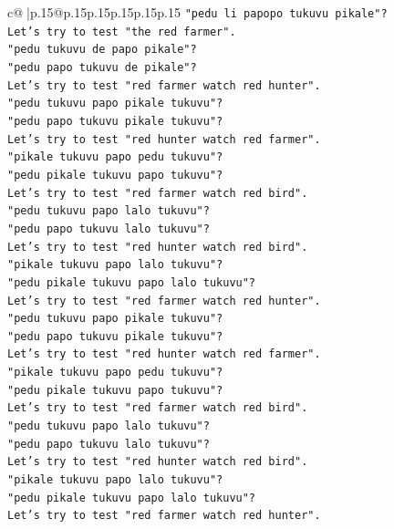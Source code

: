 \documentclass{article}
\begin{document}
{\begin{supertabular}{c@{$\;$}|p{.15\linewidth}@{}p{.15\linewidth}p{.15\linewidth}p{.15\linewidth}p{.15\linewidth}p{.15\linewidth}}
{{{\texttt{"pedu li papopo tukuvu pikale"?} \\
\texttt{Let's try to test "the red farmer".} \\
\texttt{"pedu tukuvu de papo pikale"?} \\
\texttt{"pedu papo tukuvu de pikale"?} \\
\texttt{Let's try to test "red farmer watch red hunter".} \\
\texttt{"pedu tukuvu papo pikale tukuvu"?} \\
\texttt{"pedu papo tukuvu pikale tukuvu"?} \\
\texttt{Let's try to test "red hunter watch red farmer".} \\
\texttt{"pikale tukuvu papo pedu tukuvu"?} \\
\texttt{"pedu pikale tukuvu papo tukuvu"?} \\
\texttt{Let's try to test "red farmer watch red bird".} \\
\texttt{"pedu tukuvu papo lalo tukuvu"?} \\
\texttt{"pedu papo tukuvu lalo tukuvu"?} \\
\texttt{Let's try to test "red hunter watch red bird".} \\
\texttt{"pikale tukuvu papo lalo tukuvu"?} \\
\texttt{"pedu pikale tukuvu papo lalo tukuvu"?} \\
\texttt{Let's try to test "red farmer watch red hunter".} \\
\texttt{"pedu tukuvu papo pikale tukuvu"?} \\
\texttt{"pedu papo tukuvu pikale tukuvu"?} \\
\texttt{Let's try to test "red hunter watch red farmer".} \\
\texttt{"pikale tukuvu papo pedu tukuvu"?} \\
\texttt{"pedu pikale tukuvu papo tukuvu"?} \\
\texttt{Let's try to test "red farmer watch red bird".} \\
\texttt{"pedu tukuvu papo lalo tukuvu"?} \\
\texttt{"pedu papo tukuvu lalo tukuvu"?} \\
\texttt{Let's try to test "red hunter watch red bird".} \\
\texttt{"pikale tukuvu papo lalo tukuvu"?} \\
\texttt{"pedu pikale tukuvu papo lalo tukuvu"?} \\
\texttt{Let's try to test "red farmer watch red hunter".} \\
}}}
\end{supertabular}}
\end{document}
